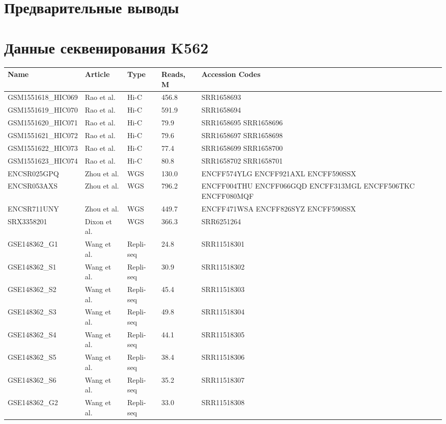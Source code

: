 \documentclass[a4paper,12pt]{article}
\begin{document}
\section{Предварительные выводы}

\newpage
\appendix

\section{Данные секвенирования K562}

\label{appendix:accession}

\bgroup
\def\arraystretch{1.5}
\begin{tabular}{| l | l | l | l | p{3cm} |}
\hline
\textbf{Name} & \textbf{Article} & \textbf{Type} & \textbf{Reads, M} & \textbf{Accession Codes} \\
\hline
GSM1551618\_HIC069 & Rao et al.\cite{rao} & Hi-C & 456.8 & SRR1658693 \\
\hline
GSM1551619\_HIC070 & Rao et al.\cite{rao} & Hi-C & 591.9 & SRR1658694 \\
\hline
GSM1551620\_HIC071 & Rao et al.\cite{rao} & Hi-C & 79.9 & SRR1658695 SRR1658696 \\
\hline
GSM1551621\_HIC072 & Rao et al.\cite{rao} & Hi-C & 79.6 & SRR1658697 SRR1658698 \\
\hline
GSM1551622\_HIC073 & Rao et al.\cite{rao} & Hi-C & 77.4 & SRR1658699 SRR1658700 \\
\hline
GSM1551623\_HIC074 & Rao et al.\cite{rao} & Hi-C & 80.8 & SRR1658702 SRR1658701 \\
\hline
ENCSR025GPQ & Zhou et al.\cite{zhou} & WGS & 130.0 & ENCFF574YLG ENCFF921AXL ENCFF590SSX \\
\hline
ENCSR053AXS & Zhou et al.\cite{zhou} & WGS & 796.2 & ENCFF004THU ENCFF066GQD ENCFF313MGL ENCFF506TKC ENCFF080MQF \\
\hline
ENCSR711UNY & Zhou et al.\cite{zhou} & WGS & 449.7 & ENCFF471WSA ENCFF826SYZ ENCFF590SSX \\
\hline
SRX3358201 & Dixon et al.\cite{dixon} & WGS & 366.3 & SRR6251264 \\
\hline
GSE148362\_G1 & Wang et al.\cite{wang} & Repli-seq & 24.8 & SRR11518301 \\
\hline
GSE148362\_S1 & Wang et al.\cite{wang} & Repli-seq & 30.9 & SRR11518302 \\
\hline
GSE148362\_S2 & Wang et al.\cite{wang} & Repli-seq & 45.4 & SRR11518303 \\
\hline
GSE148362\_S3 & Wang et al.\cite{wang} & Repli-seq & 49.8 & SRR11518304 \\
\hline
GSE148362\_S4 & Wang et al.\cite{wang} & Repli-seq & 44.1 & SRR11518305 \\
\hline
GSE148362\_S5 & Wang et al.\cite{wang} & Repli-seq & 38.4 & SRR11518306 \\
\hline
GSE148362\_S6 & Wang et al.\cite{wang} & Repli-seq & 35.2 & SRR11518307 \\
\hline
GSE148362\_G2 & Wang et al.\cite{wang} & Repli-seq & 33.0 & SRR11518308 \\
\hline
\end{tabular}
\end{document}
